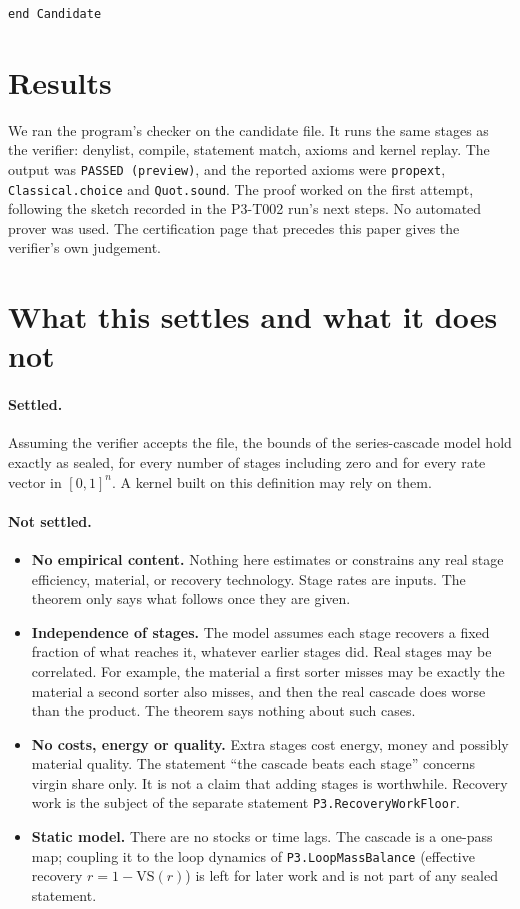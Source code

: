 \documentclass[11pt]{article}
\theoremstyle{definition}
\theoremstyle{remark}
\begin{document}
\begin{lstlisting}[caption={The complete candidate proof \texttt{proofs/P3.CascadedRecovery.lean}.}]
end Candidate
\end{lstlisting}

\section{Results}
\label{sec:results}
We ran the program's checker on the candidate file. It runs the same stages as the verifier:
denylist, compile, statement match, axioms and kernel replay. The output was
\texttt{PASSED (preview)}, and the reported axioms were \texttt{propext},
\texttt{Classical.choice} and \texttt{Quot.sound}. The proof worked on the first attempt,
following the sketch recorded in the P3-T002 run's next steps. No automated prover was used. The
certification page that precedes this paper gives the verifier's own judgement.

\section{What this settles and what it does not}
\label{sec:limits}
\paragraph{Settled.} Assuming the verifier accepts the file, the bounds of the series-cascade
model hold exactly as sealed, for every number of stages including zero and for every rate
vector in $[0,1]^n$. A kernel built on this definition may rely on them.

\paragraph{Not settled.}
\begin{itemize}
\item \textbf{No empirical content.} Nothing here estimates or constrains any real stage
efficiency, material, or recovery technology. Stage rates are inputs. The theorem only says what
follows once they are given.
\item \textbf{Independence of stages.} The model assumes each stage recovers a fixed fraction of
what reaches it, whatever earlier stages did. Real stages may be correlated. For example, the
material a first sorter misses may be exactly the material a second sorter also misses, and then
the real cascade does worse than the product. The theorem says nothing about such cases.
\item \textbf{No costs, energy or quality.} Extra stages cost energy, money and possibly
material quality. The statement ``the cascade beats each stage'' concerns virgin share only. It
is not a claim that adding stages is worthwhile. Recovery work is the subject of the separate
statement \texttt{P3.RecoveryWorkFloor}.
\item \textbf{Static model.} There are no stocks or time lags. The cascade is a one-pass map;
coupling it to the loop dynamics of \texttt{P3.LoopMassBalance} (effective recovery
$r=1-\mathrm{VS}(r)$) is left for later work and is not part of any sealed statement.
\end{itemize}
\end{document}
